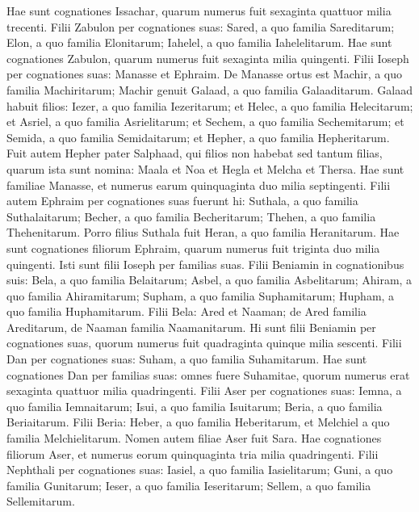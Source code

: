 \begin{biblechapter}
\verse Hae sunt cognationes Issachar, quarum numerus fuit sexaginta quattuor milia trecenti. 
\verse Filii Zabulon per cognationes suas: Sared, a quo familia Sareditarum; Elon, a quo familia Elonitarum; Iahelel, a quo familia Iahelelitarum. 
\verse Hae sunt cognationes Zabulon, quarum numerus fuit sexaginta milia quingenti. 
\verse Filii Ioseph per cognationes suas: Manasse et Ephraim. 
\verse De Manasse ortus est Machir, a quo familia Machiritarum; Machir genuit Galaad, a quo familia Galaaditarum. 
\verse Galaad habuit filios: Iezer, a quo familia Iezeritarum; et Helec, a quo familia Helecitarum; 
\verse et Asriel, a quo familia Asrielitarum; et Sechem, a quo familia Sechemitarum; 
\verse et Semida, a quo familia Semidaitarum; et Hepher, a quo familia Hepheritarum. 
\verse Fuit autem Hepher pater Salphaad, qui filios non habebat sed tantum filias, quarum ista sunt nomina: Maala et Noa et Hegla et Melcha et Thersa. 
\verse Hae sunt familiae Manasse, et numerus earum quinquaginta duo milia septingenti. 
\verse Filii autem Ephraim per cognationes suas fuerunt hi: Suthala, a quo familia Suthalaitarum; Becher, a quo familia Becheritarum; Thehen, a quo familia Thehenitarum. 
\verse Porro filius Suthala fuit Heran, a quo familia Heranitarum.  
\verse Hae sunt cognationes filiorum Ephraim, quarum numerus fuit triginta duo milia quingenti. Isti sunt filii Ioseph per familias suas. 
\verse Filii Beniamin in cognationibus suis: Bela, a quo familia Belaitarum; Asbel, a quo familia Asbelitarum; Ahiram, a quo familia Ahiramitarum; 
\verse Supham, a quo familia Suphamitarum; Hupham, a quo familia Huphamitarum. 
\verse Filii Bela: Ared et Naaman; de Ared familia Areditarum, de Naaman familia Naamanitarum.  
\verse Hi sunt filii Beniamin per cognationes suas, quorum numerus fuit quadraginta quinque milia sescenti. 
\verse Filii Dan per cognationes suas: Suham, a quo familia Suhamitarum. Hae sunt cognationes Dan per familias suas: 
\verse omnes fuere Suhamitae, quorum numerus erat sexaginta quattuor milia quadringenti. 
\verse Filii Aser per cognationes suas: Iemna, a quo familia Iemnaitarum; Isui, a quo familia Isuitarum; Beria, a quo familia Beriaitarum. 
\verse Filii Beria: Heber, a quo familia Heberitarum, et Melchiel a quo familia Melchielitarum.  
\verse Nomen autem filiae Aser fuit Sara. 
\verse Hae cognationes filiorum Aser, et numerus eorum quinquaginta tria milia quadringenti. 
\verse Filii Nephthali per cognationes suas: Iasiel, a quo familia Iasielitarum; Guni, a quo familia Gunitarum; 
\verse Ieser, a quo familia Ieseritarum; Sellem, a quo familia Sellemitarum. 

\end{biblechapter}
